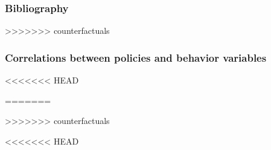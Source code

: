 \documentclass{beamer}
\begin{document}
\begin{frame}[allowframebreaks]
\frametitle{Bibliography}
\footnotesize

\end{frame}


>>>>>>> counterfactuals

\begin{frame}
  \frametitle{Correlations between policies and behavior variables}\vspace{-0.05cm}
\begin{table}%
  \begin{minipage}{\linewidth}
    \resizebox{\linewidth}{!}{
      
    }\smallskip
  \end{minipage}
\end{table}
<<<<<<< HEAD
 
=======

>>>>>>> counterfactuals
\end{frame}




<<<<<<< HEAD



\end{document}
